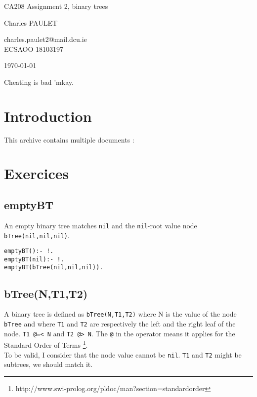 \documentclass{article}
\begin{document}
\Large
\begin{center}
  CA208 Assignment 2, binary trees\\
  \hspace{10pt}

  \large
  Charles PAULET \\
  \hspace{10pt}

  \small
  charles.paulet2@mail.dcu.ie \\
  ECSAOO 18103197 \\
  \bigbreak

  \today
\end{center}
\hspace{10pt}

\normalsize
Cheating is bad 'mkay.

\newpage

\section*{Introduction}

This archive contains multiple documents :
\medbreak
{}

\section*{Exercices}
  \subsection*{emptyBT}
    An empty binary tree matches \texttt{nil} and the \texttt{nil}-root
    value node \texttt{bTree(nil,nil,nil)}.

    \begin{verbatim}
emptyBT():- !.
emptyBT(nil):- !.
emptyBT(bTree(nil,nil,nil)).
    \end{verbatim}
  \subsection*{bTree(N,T1,T2)}
    A binary tree is defined as \texttt{bTree(N,T1,T2)} where N is
    the value of the node \texttt{bTree} and where \texttt{T1} and  \texttt{T2} are
    respectively the left and the right leaf of the node. \texttt{T1 @=< N} and \texttt{T2 @> N}.
    The \texttt{@} in the operator means it applies for the Standard Order of Terms \footnote{http://www.swi-prolog.org/pldoc/man?section=standardorder}.\\
    To be valid, I consider that the node value cannot be \texttt{nil}. \texttt{T1} and  \texttt{T2} might
    be subtrees, we should match it.
\end{document}

